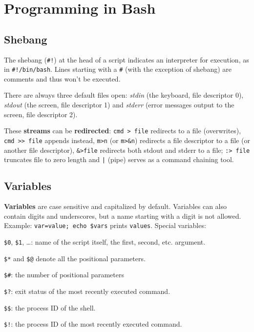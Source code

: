 \section{Programming in Bash}
\subsection{Shebang}
The shebang (\texttt{\#!}) at the head of a script indicates an 
interpreter for execution, as in \texttt{\#!/bin/bash}.
Lines starting with a \texttt{\#} (with the exception of shebang) 
are comments and thus won't be executed.

There are always three default files open:
\emph{stdin} (the keyboard, file descriptor 0),
\emph{stdout} (the screen, file descriptor 1) and
\emph{stderr} (error messages output to the screen, file descriptor 2).

These \textbf{streams} can be \textbf{redirected}: 
\texttt{cmd > file} redirects to a file (overwrites),
\texttt{cmd >{}> file} appends instead,
\texttt{m>n} (or \texttt{m>\&n}) redirects a file descriptor to a file 
(or another file descriptor), 
\texttt{\&>file} redirects both stdout and stderr to a file;
\texttt{:> file} truncates file to zero length and
\texttt{|} (pipe) serves as a command chaining tool.

\subsection{Variables}
\textbf{Variables} are case sensitive and capitalized by default.
Variables can also contain digits and underscores,
but a name starting with a digit is not allowed.
Example: \texttt{var=value; echo \${var}s} prints \texttt{values}.
Special variables:
\begin{enumx}
	\item \texttt{\$0}, \texttt{\$1}, \ldots: name of the script itself,
	the first, second, etc. argument.
	\item \texttt{\$*} and \texttt{\$@} denote all the positional parameters.
	\item \texttt{\$\#}: the number of positional parameters
	\item \texttt{\$?}: exit status of the most recently executed command.
	\item \texttt{\$\$}: the process ID of the shell.
	\item \texttt{\$!}: the process ID of the most recently executed command.
\end{enumx}

